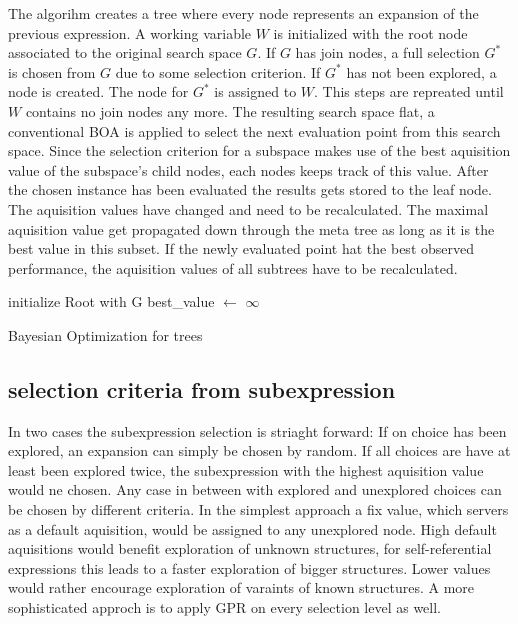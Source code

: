 \documentclass[english]{article}
\begin{document}
The algorihm creates a tree where every node represents an expansion of the previous expression. A working variable $W$ is initialized with the root node associated to the original search space $G$. If $G$ has join nodes, a full selection $G^*$ is chosen from $G$ due to some selection criterion. If $G^*$ has not been explored, a node is created. The node for $G^*$ is assigned to $W$. This steps are repreated until $W$ contains no join nodes any more. The resulting search space flat, a conventional \ac{BOA} is applied to select the next evaluation point from this search space. Since the selection criterion for a subspace makes use of the best aquisition value of the subspace's child nodes, each nodes keeps track of this value. After the chosen instance has been evaluated the results gets stored to the leaf node. The aquisition values have changed and need to be recalculated. The maximal aquisition value get propagated down through the meta tree as long as it is the best value in this subset. If the newly evaluated point hat the best observed performance, the aquisition values of all subtrees have to be recalculated.



\begin{algorithm}[H]
\SetAlgoLined
initialize Root with G\;
best\_value $\leftarrow$ $\infty$\;


\caption{Bayesian Optimization for trees}

\end{algorithm}
%
\subsection*{selection criteria from subexpression}
In two cases the subexpression selection is striaght forward: If on choice has been explored, an expansion can simply be chosen by random. If all choices are have at least been explored twice, the subexpression with the highest aquisition value would ne chosen. Any case in between with explored and unexplored choices can be chosen by different criteria.
In the simplest approach a fix value, which servers as a default aquisition, would be assigned to any unexplored node. High default aquisitions would benefit exploration of unknown structures, for self-referential expressions this leads to a faster exploration of bigger structures. Lower values would rather encourage exploration of varaints of known structures.
A more sophisticated approch is to apply \ac{GPR} on every selection level as well.
\end{document}
